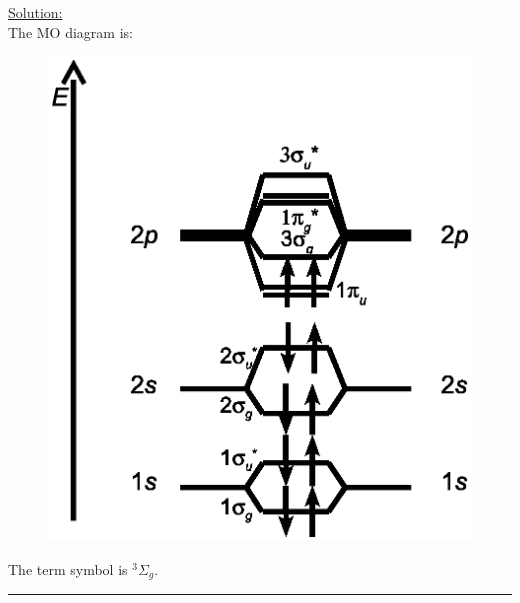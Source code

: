 \noindent
\underline{Solution:}\\

\noindent
The MO diagram is:\\
\noindent
\begin{figure}[h]
\centering
\includegraphics[scale=0.5]{b2mo}
\end{figure}

\noindent
The term symbol is $^3\Sigma_g$.\\

\hrule\vspace{0.5cm}
